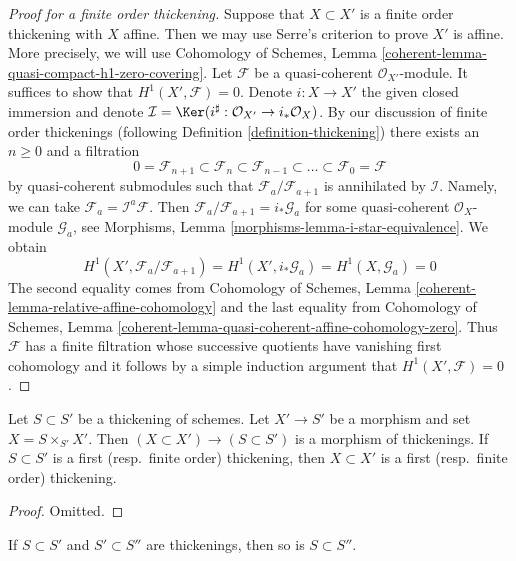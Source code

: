 \begin{proof}[Proof for a finite order thickening]
Suppose that $X \subset X'$ is a finite order thickening with $X$ affine. Then
we may use Serre's criterion to prove $X'$ is affine. More precisely, we will
use Cohomology of Schemes, Lemma
\ref{coherent-lemma-quasi-compact-h1-zero-covering}. Let $\mathcal{F}$ be a
quasi-coherent $\mathcal{O}_{X'}$-module. It suffices to show that
$H^1(X', \mathcal{F}) = 0$. Denote $i : X \to X'$ the given closed immersion
and denote
$\mathcal{I} = \Ker(i^\sharp : \mathcal{O}_{X'} \to i_*\mathcal{O}_X)$.
By our discussion of finite order thickenings (following
Definition \ref{definition-thickening}) there exists an $n \geq 0$
and a filtration
$$
0 = \mathcal{F}_{n + 1} \subset \mathcal{F}_n \subset
\mathcal{F}_{n - 1} \subset \ldots \subset
\mathcal{F}_0 = \mathcal{F}
$$
by quasi-coherent submodules such that $\mathcal{F}_a/\mathcal{F}_{a + 1}$ is
annihilated by $\mathcal{I}$. Namely, we can take
$\mathcal{F}_a = \mathcal{I}^a\mathcal{F}$. Then
$\mathcal{F}_a/\mathcal{F}_{a + 1} = i_*\mathcal{G}_a$ for some quasi-coherent
$\mathcal{O}_X$-module $\mathcal{G}_a$, see Morphisms, Lemma
\ref{morphisms-lemma-i-star-equivalence}. We obtain
$$
H^1(X', \mathcal{F}_a/\mathcal{F}_{a + 1}) =
H^1(X', i_*\mathcal{G}_a) = H^1(X, \mathcal{G}_a) = 0
$$
The second equality comes from Cohomology of Schemes, Lemma
\ref{coherent-lemma-relative-affine-cohomology}
and the last equality from Cohomology of Schemes, Lemma
\ref{coherent-lemma-quasi-coherent-affine-cohomology-zero}.
Thus $\mathcal{F}$ has a finite filtration whose successive quotients
have vanishing first cohomology and it follows by a simple
induction argument that $H^1(X', \mathcal{F}) = 0$.
\end{proof}

\begin{lemma}
\label{lemma-base-change-thickening}
Let $S \subset S'$ be a thickening of schemes. Let $X' \to S'$ be a morphism
and set $X = S \times_{S'} X'$. Then $(X \subset X') \to (S \subset S')$
is a morphism of thickenings. If $S \subset S'$ is a first
(resp.\ finite order) thickening, then $X \subset X'$ is a first
(resp.\ finite order) thickening.
\end{lemma}

\begin{proof}
Omitted.
\end{proof}

\begin{lemma}
\label{lemma-composition-thickening}
If $S \subset S'$ and $S' \subset S''$ are thickenings, then so is
$S \subset S''$.
\end{lemma}

